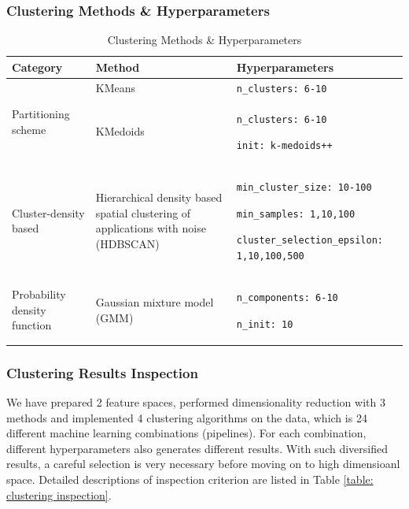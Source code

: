 \documentclass[a4paper]{article}
\begin{document}
\subsubsection{Clustering Methods \& Hyperparameters}

\begin{table}[h!]
    \centering
    \caption{Clustering Methods \& Hyperparameters}
    \begin{tabular}{p{}|p{}|p{}}
    \hline \hline
        \textbf{Category} & \textbf{Method} & \textbf{Hyperparameters} \\
        \hline
        \multirow{2}{.3\textwidth}{Partitioning scheme} & KMeans & \texttt{n\_clusters: 6-10} \\
        & KMedoids & \texttt{n\_clusters: 6-10} \par \texttt{init: k-medoids++} \\
        \hline
        Cluster-density based & Hierarchical density based spatial clustering of applications with noise (HDBSCAN) & \texttt{min\_cluster\_size: 10-100} \par \texttt{min\_samples: 1,10,100} \par \texttt{cluster\_selection\_epsilon: 1,10,100,500} \\
        \hline
        Probability density function & Gaussian mixture model (GMM) & \texttt{n\_components: 6-10} \par \texttt{n\_init: 10} \\
        \hline \hline
    \end{tabular}
    \label{table: clustering methods}
\end{table}

\subsubsection{Clustering Results Inspection} \label{sec: clustering inspection}
We have prepared 2 feature spaces, performed dimensionality reduction with 3 methods and implemented 4 clustering algorithms on the data, which is 24 different machine learning combinations (pipelines). For each combination, different hyperparameters also generates different results. With such diversified results, a careful selection is very necessary before moving on to high dimensioanl space. Detailed descriptions of inspection criterion are listed in Table \ref{table: clustering inspection}.
\end{document}
